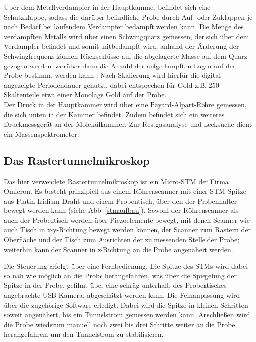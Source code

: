  Über dem Metallverdampfer in der Hauptkammer befindet sich eine
Schutzklappe, sodass die darüber befindliche Probe durch Auf- oder Zuklappen je nach Bedarf bei
laufendem Verdampfer bedampft werden kann. Die Menge des verdampften Metalls wird über einen
Schwingquarz gemessen, der sich über dem Verdampfer befindet und somit mitbedampft wird; anhand der
Änderung der Schwingfrequenz können Rückschlüsse auf die abgelagerte Masse auf dem Quarz gezogen
werden, worüber dann die Anzahl der aufgedampften Lagen auf der Probe bestimmt werden kann
\cite{Sau}.
Nach Skalierung wird hierfür die digital angezeigte Periodendauer genutzt, dabei entsprechen für Gold
z.B. 250 Skaltenteile etwa einer Monolage Gold auf der Probe.\\
Der Druck in der Hauptkammer wird über eine Bayard-Alpart-Röhre gemessen, die sich unten in der
Kammer befindet. Zudem befindet sich ein weiteres Druckmessgerät %
an der Molekülkammer.
Zur Restgasanalyse und Lecksuche dient ein Massenspektrometer.%


\subsection{Das Rastertunnelmikroskop}

Das hier verwendete Rastertunnelmikroskop ist ein Micro-STM der Firma Omicron. Es besteht
prinzipiell aus einem Röhrenscanner mit einer STM-Spitze aus Platin-Iridium-Draht und einem
Probentisch, über den der Probenhalter bewegt werden kann (siehe Abb. \ref{stmaufbau}). Sowohl der
Röhren\-scanner als auch der Probentisch werden über Piezoelemente bewegt, mit denen Scanner
wie auch Tisch in x-y-Richtung bewegt werden können, der Scanner zum Rastern der Oberfläche und der
Tisch zum Ausrichten der zu messenden Stelle der Probe; weiterhin kann der Scanner in z-Richtung an
die Probe angenähert werden.

Die Steuerung erfolgt über eine Fernbedienung.
Die Spitze des STMs wird dabei so nah wie möglich an die Probe herangefahren, was über die
Spiegelung der Spitze in der Probe, gefilmt über eine schräg unterhalb des Probentisches angebrachte
USB-Kamera, abgeschätzt werden kann. Die Feinanpassung wird über die zugehörige Software erledigt.
Dabei wird die Spitze in kleinen Schritten soweit angenähert, bis ein Tunnelstrom gemessen werden
kann. Anschließen wird die Probe wiederum manuell noch zwei bis drei Schritte weiter an die Probe
herangefahren, um den Tunnelstrom zu stabilisieren.\\

